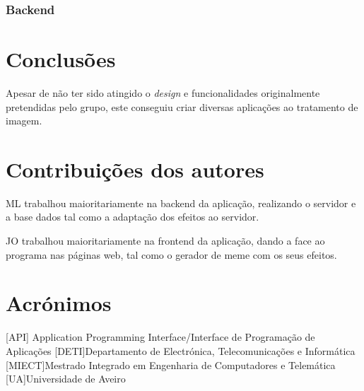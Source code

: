 \documentclass{report}
\begin{document}
\subsection{Backend}

\chapter{Conclusões}
\label{chap.conc}
	Apesar de não ter sido atingido o \textit{design} e funcionalidades originalmente pretendidas pelo grupo, este conseguiu criar diversas aplicações ao tratamento de imagem.


\chapter*{Contribuições dos autores}

ML trabalhou maioritariamente na backend da aplicação, realizando o servidor e a base dados tal como a adaptação dos efeitos ao servidor.

JO trabalhou maioritariamente na frontend da aplicação, dando a face ao programa nas páginas web, tal como o gerador de meme com os seus efeitos.

\chapter*{Acrónimos}
\begin{acronym}
 [API] {Application Programming Interface/Interface de Programação de Aplicações}
 [DETI]{Departamento de Electrónica, Telecomunicações e Informática}
 [MIECT]{Mestrado Integrado em Engenharia de Computadores e Telemática}
 [UA]{Universidade de Aveiro}
\end{acronym}


%
\end{document}
